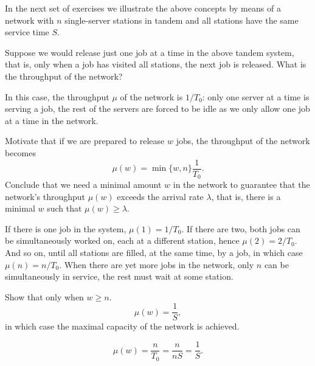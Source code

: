 In the next set of exercises we illustrate the above concepts by means of a network with $n$ single-server stations in tandem and all stations have the same service time $S$. 

\begin{exercise}
Suppose we would release just one job at a time in the above tandem system, that is,  only when a job has visited all stations, the next job is released. What is the throughput of the network?
\begin{solution}
In this case, the throughput $\mu$ of the network is $1/T_0$: only one server at a time is serving a job, the rest of the servers are forced to be idle as we only allow one job at a time in the network. 
\end{solution}
\end{exercise}

\begin{exercise}
Motivate that if we are prepared to release $w$ jobs, the throughput of the network becomes
\begin{equation*}
  \mu(w) = \min\{w, n\} \frac 1{T_0}.
\end{equation*}
Conclude that we need a minimal amount $w$ in the network to guarantee that
the network's throughput $\mu(w)$ exceeds the arrival rate $\lambda$, that is, there is a minimal $w$ such that $\mu(w) \geq \lambda$.
\begin{solution}
If there is one job in the system, $\mu(1) = 1/T_0$. If there are two, both jobs can be simultaneously worked on, each at  a different station, hence $\mu(2)=2/T_0$. And so on, until all stations are filled, at the same time, by a job, in which case $\mu(n) = n/T_0$. When there are yet more jobs in the network, only $n$ can be simultaneously in service, the rest must wait at some station.
\end{solution}
\end{exercise}


\begin{exercise}
Show that  only when $w\geq n$.
\begin{equation*}
\mu(w) = \frac 1S,
\end{equation*}
in which case the maximal capacity of the network is achieved.
\begin{solution}
\begin{equation*}
  \mu(w) = \frac{n}{T_0} = \frac{n}{n S} = \frac 1S.
\end{equation*}
\end{solution}
\end{exercise}

